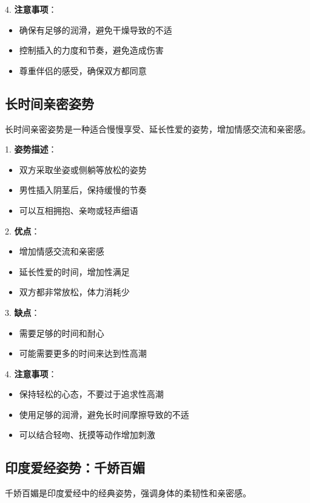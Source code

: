 \documentclass[12pt,UTF8]{ctexbook}
\begin{document}
4. \textbf{注意事项}：
  \begin{itemize}
  \item 确保有足够的润滑，避免干燥导致的不适
  \item 控制插入的力度和节奏，避免造成伤害
  \item 尊重伴侣的感受，确保双方都同意
  \end{itemize}

\subsection{长时间亲密姿势}

长时间亲密姿势是一种适合慢慢享受、延长性爱的姿势，增加情感交流和亲密感。

1. \textbf{姿势描述}：
  \begin{itemize}
  \item 双方采取坐姿或侧躺等放松的姿势
  \item 男性插入阴茎后，保持缓慢的节奏
  \item 可以互相拥抱、亲吻或轻声细语
  \end{itemize}

2. \textbf{优点}：
  \begin{itemize}
  \item 增加情感交流和亲密感
  \item 延长性爱的时间，增加性满足
  \item 双方都非常放松，体力消耗少
  \end{itemize}

3. \textbf{缺点}：
  \begin{itemize}
  \item 需要足够的时间和耐心
  \item 可能需要更多的时间来达到性高潮
  \end{itemize}

4. \textbf{注意事项}：
  \begin{itemize}
  \item 保持轻松的心态，不要过于追求性高潮
  \item 使用足够的润滑，避免长时间摩擦导致的不适
  \item 可以结合轻吻、抚摸等动作增加刺激
  \end{itemize}

\subsection{印度爱经姿势：千娇百媚}

千娇百媚是印度爱经中的经典姿势，强调身体的柔韧性和亲密感。
\end{document}
